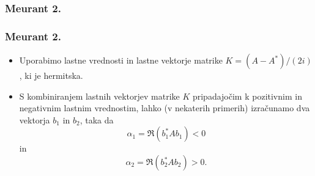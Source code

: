 \documentclass{beamer}
\newcommand{\norm}[1]{\left\lVert#1\right\rVert}
\newcommand{\R}{\mathbb R}
\newtheorem{lema}[izrek]{Lema}
\begin{document}
\subsubsection{Meurant 2.}
\begin{frame}
\frametitle{Meurant 2.}
\begin{itemize}
\item Uporabimo lastne vrednosti in lastne vektorje matrike $K=(A-A^\ast)/(2i)$, ki je hermitska. 
\item S kombiniranjem lastnih vektorjev matrike $K$ pripadajočim k pozitivnim in negativnim lastnim vrednostim, lahko (v nekaterih primerih) izračunamo dva vektorja $b_1$ in $b_2$, taka da $$\alpha_1=\Re(b_1^\ast Ab_1)<0$$ in $$\alpha_2=\Re(b_2^\ast Ab_2)>0.$$
\end{itemize}
\end{frame}
\end{document}
